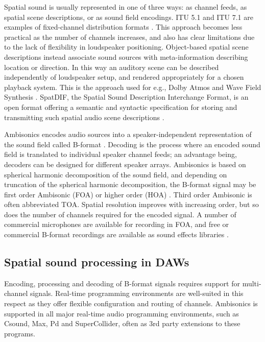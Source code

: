 \documentclass{article}
\begin{document}
Spatial sound is usually represented in one of three ways: as channel feeds, as spatial scene descriptions, or as sound field encodings.
ITU 5.1 and ITU 7.1 are examples of fixed-channel distribution formats \cite{ITU:1993_surround_5:1}.
This approach becomes less practical as the number of channels increases, and also has clear limitations due to the lack of flexibility in loudspeaker positioning.
Object-based spatial scene descriptions instead associate sound sources with meta-information describing location or direction. In this way an auditory scene can be described independently of loudspeaker setup, and rendered appropriately for a chosen playback system.
This is the approach used for e.g., Dolby Atmos and Wave Field Synthesis \cite{Berkhout:1993wfs,dolby:2014atmos}.
SpatDIF, the Spatial Sound Description Interchange Format, is an open format offering a semantic and syntactic specification for storing and transmitting such spatial audio scene descriptions \cite{Peters:2013spatdif}.

Ambisonics encodes audio sources into a speaker-inde\-pendent representation of the sound field called B-format  \cite{gerzon:1985JAES}.
Decoding is the process where an encoded sound field is translated to individual speaker channel feeds; an advantage being,  decoders can be designed for different speak\-er arrays.
Ambisonics is based on spherical harmonic decomposition of the sound field, and depending on truncation of the spherical harmonic decomposition, 
the B-for\-mat signal may be first order Ambisonic (FOA) or higher order (HOA) \cite{daniel:2001phd}.
Third order Ambisonic is often abbreviated TOA.
Spatial resolution improves with increasing order, but so does the number of channels required for the encoded signal.
A number of commercial microphones are available for recording in FOA, and free or commercial B-format recordings are available as sound effects libraries \cite{farrar:1979soundfield,deleflie2014:ambisonia,darcourt:2014surlib}.




\subsection{Spatial sound processing in DAWs}\label{sec:daws}

Encoding, processing and decoding of B-format signals requires support for multi-channel signals.
Real-time programming environments are well-suited in this respect as they offer flexible configuration and routing of channels. Ambisonics is supported in all major real-time audio programming environments, such as Csound, Max, Pd and SuperCollider, often as 3rd party extensions to these programs.
\end{document}
